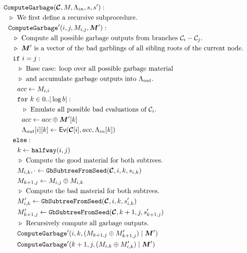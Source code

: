 \begin{figure}
  \begin{align*}
    &\computegarbage(\vec{\cir}, \mat, \Lambda_{in}, s, s'):\\
    &~~\codecomment{We first define a recursive subprocedure.}\\
    &~~\computegarbage'(i, j, \mat_{i,j}, \vec{\mat}'):\\
    &~~~~\codecomment{Compute all possible garbage outputs from
    branches $\cir_i-\cir_j$.}\\
    &~~~~\codecomment{$\vec{\mat}'$ is a vector of the bad garblings of
      all sibling roots of the current node.}\\
    &~~~~\cif~i = j:\\
    &~~~~~~\codecomment{Base case: loop over all possible garbage material}\\
    &~~~~~~\codecomment{and accumulate garbage outputs into
    $\Lambda_{out}$.}\\
    &~~~~~~acc \gets \mat_{i,i}\\
    &~~~~~~\cfor~k \in 0..|\log b|:\\
    &~~~~~~~~\codecomment{Emulate all possible bad evaluations of $\cir_i$.}\\
    &~~~~~~~~acc \gets acc \oplus \vec{\mat}'[k]\\
    &~~~~~~~~\Lambda_{out}[i][k] \gets \gEv(\vec{\cir}[i], acc, \Lambda_{in}[k])\\
    &~~~~\celse:\\
    &~~~~~~k \gets \halfway(i, j)\\
    &~~~~~~\codecomment{Compute the good material for both subtrees.}\\
    &~~~~~~\mat_{i, k}, \cdot \gets \gbtree(\vec{\cir}, i, k, s_{i, k})\\
    &~~~~~~\mat_{k+1, j} \gets \mat_{i, j} \oplus \mat_{i, k}\\
    &~~~~~~\codecomment{Compute the bad material for both subtrees.}\\
    &~~~~~~\mat_{i, k}' \gets \gbtree(\vec{\cir}, i, k, s'_{i, k})\\
    &~~~~~~\mat_{k+1, j}' \gets \gbtree(\vec{\cir}, k+1, j, s'_{k+1, j})\\
    &~~~~~~\codecomment{Recursively compute all garbage outputs.}\\
    &~~~~~~\computegarbage'(i, k, (\mat_{k+1,j} \oplus \mat_{k+1,j}') \mid \vec{\mat}')\\
    &~~~~~~\computegarbage'(k+1, j, (\mat_{i,k} \oplus \mat_{i,k}') \mid \vec{\mat}')\\

\end{align*}
\end{figure}
